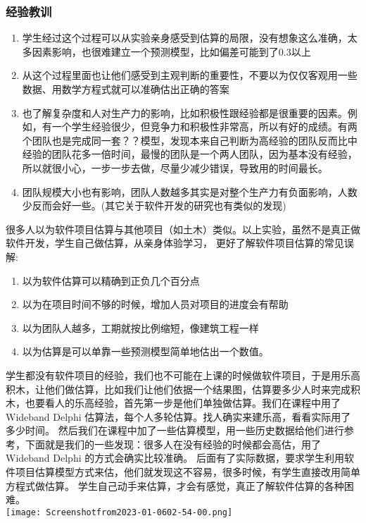 \hypertarget{ux7ecfux9a8cux6559ux8bad}{%
\subsubsection{经验教训}\label{ux7ecfux9a8cux6559ux8bad}}

\begin{enumerate}
\tightlist
\item
  学生经过这个过程可以从实验亲身感受到估算的局限，没有想象这么准确，太多因素影响，也很难建立一个预测模型，比如偏差可能到了0.3以上
\item
  从这个过程里面也让他们感受到主观判断的重要性，不要以为仅仅客观用一些数据、用数学方程式就可以准确估出正确的答案
\item
  也了解复杂度和人对生产力的影响，比如积极性跟经验都是很重要的因素。例如，有一个学生经验很少，但竞争力和积极性非常高，所以有好的成绩。有两个团队也是完成同一套？？模型，发现本来自己判断为高经验的团队反而比中经验的团队花多一倍时间，最慢的团队是一个两人团队，因为基本没有经验，所以就很小心，一步一步去做，尽量少减少错误，导致用的时间最长。
\item
  团队规模大小也有影响，团队人数越多其实是对整个生产力有负面影响，人数少反而会好一些。(其它关于软件开发的研究也有类似的发现)
\end{enumerate}

很多人以为软件项目估算与其他项目（如土木）类似。以上实验，虽然不是真正做软件开发，学生自己做估算，从亲身体验学习，
更好了解软件项目估算的常见误解:

\begin{enumerate}
\tightlist
\item
  以为软件估算可以精确到正负几个百分点
\item
  以为在项目时间不够的时候，增加人员对项目的进度会有帮助
\item
  以为团队人越多，工期就按比例缩短，像建筑工程一样
\item
  以为估算是可以单靠一些预测模型简单地估出一个数值。
\end{enumerate}

学生都没有软件项目的经验，我们也不可能在上课的时候做软件项目，于是用乐高积木，让他们做估算，比如我们让他们依据一个结果图，估算要多少人时来完成积木，也要看人的乐高经验，首先第一步是他们单独做估算。我们在课程中用了Wideband
Delphi 估算法，每个人多轮估算。找人确实来建乐高，看看实际用了多少时间。
然后我们在课程中加了一些估算模型，用一些历史数据给他们进行参考，下面就是我们的一些发现：很多人在没有经验的时候都会高估，用了Wideband
Delphi 的方式会确实比较准确。
后面有了实际数据，要求学生利用软件项目估算模型方式来估，他们就发现这不容易，很多时候，有学生直接改用简单方程式做估算。
学生自己动手来估算，才会有感觉，真正了解软件估算的各种困难。\\
\texttt{[image: Screenshotfrom2023-01-0602-54-00.png]}\\

